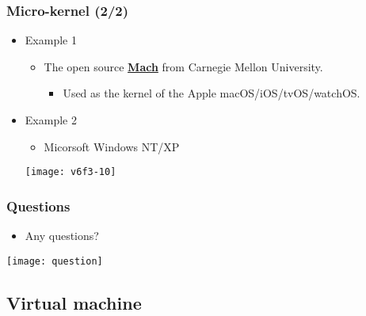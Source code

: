 \documentclass[CJKutf8,xcolor=pdftex,dvipsnames,table]{beamer}
\begin{document}
\begin{CJK*}{UTF8}{song}
  \begin{frame}
    \frametitle{Micro-kernel (2/2)} \pause
    \begin{itemize}
    \item{Example 1} \pause
      \begin{itemize}
      \item{The open source \href{https://www.cs.cmu.edu/afs/cs/project/mach/public/www/mach.html}{\textbf{Mach}} from Carnegie Mellon University.} \pause
        \begin{itemize}
        \item{Used as the kernel of the Apple macOS/iOS/tvOS/watchOS.} \pause
        \end{itemize}
      \end{itemize}
    \item{Example 2} \pause
      \begin{itemize}
      \item{Micorsoft Windows NT/XP} \pause
      \end{itemize}
      \begin{center}
        \texttt{[image: v6f3-10]}
      \end{center}
    \end{itemize}
  \end{frame}
  
  \begin{frame}
    \frametitle{Questions}
    \begin{itemize}
    \item{Any questions?}
    \end{itemize}
    \begin{center}
      \texttt{[image: question]}
    \end{center}
  \end{frame}
  
  \subsection{Virtual machine}


\end{CJK*}
\end{document}
